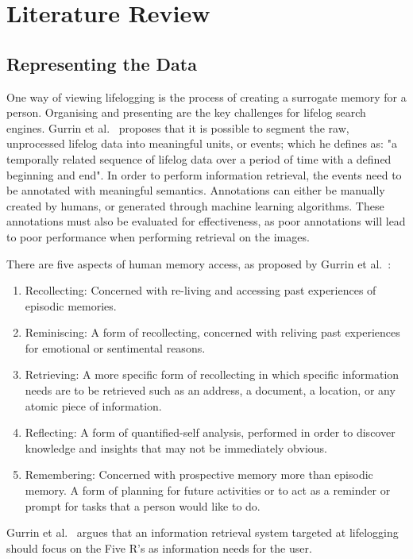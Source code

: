 \chapter{Literature Review}

\section{Representing the Data}
One way of viewing lifelogging is the process of creating a surrogate memory for a person. Organising and presenting are the key challenges for lifelog search engines. Gurrin et al.~\cite{gurrin2014lifelogging} proposes that it is possible to segment the raw, unprocessed lifelog data into meaningful units, or events; which he defines as: "a temporally related sequence of lifelog data over a period of time with a defined beginning and end". In order to perform information retrieval, the events need to be annotated with meaningful semantics. Annotations can either be manually created by humans, or generated through machine learning algorithms. These annotations must also be evaluated for effectiveness, as poor annotations will lead to poor performance when performing retrieval on the images.

There are five aspects of human memory access, as proposed by Gurrin et al.~\cite{gurrin2014lifelogging}:
\begin{enumerate}
    \item Recollecting: Concerned with re-living and accessing past experiences of episodic memories.
    \item Reminiscing: A form of recollecting, concerned with reliving past experiences for emotional or sentimental reasons.
    \item Retrieving: A more specific form of recollecting  in which specific information needs are to be retrieved such as an address, a document, a location, or any atomic piece of information.
    \item Reflecting: A form of quantified-self analysis, performed in order to discover knowledge and insights that may not be immediately obvious.
    \item Remembering: Concerned with prospective memory more than episodic memory. A form of planning for future activities or to act as a reminder or prompt for tasks that a person would like to do.
\end{enumerate}
Gurrin et al.~\cite{gurrin2014lifelogging} argues that an information retrieval system targeted at lifelogging should focus on the Five R's as information needs for the user.

